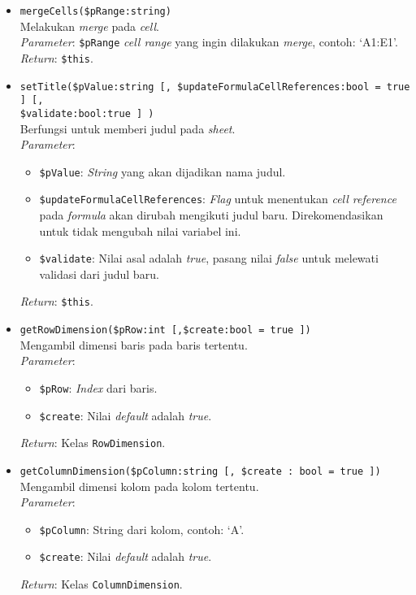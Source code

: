 \begin{itemize}
	\item \texttt{mergeCells(\$pRange:string)} \\ 
	Melakukan \textit{merge} pada \textit{cell}. \\ 
	\textit{Parameter}: \texttt{\$pRange} \textit{cell range} yang ingin dilakukan \textit{merge}, contoh: `A1:E1'. \\
	\textit{Return}: \texttt{\$this}.
	\item \texttt{setTitle(\$pValue:string [, \$updateFormulaCellReferences:bool = true ] [, \\ \$validate:bool:true ] )}\\
	 Berfungsi untuk memberi judul pada \textit{sheet}. \\
	 \textit{Parameter}:
	 \begin{itemize}
	 	\item \texttt{\$pValue}: \textit{String} yang akan dijadikan nama judul.
	 	\item \texttt{\$updateFormulaCellReferences}: \textit{Flag} untuk menentukan \textit{cell reference} pada \textit{formula} akan dirubah mengikuti judul baru. Direkomendasikan untuk tidak mengubah nilai variabel ini.
	 	\item \texttt{\$validate}: Nilai asal adalah \textit{true}, pasang nilai \textit{false} untuk melewati validasi dari judul baru.
	 \end{itemize}
 	\textit{Return}: \texttt{\$this}.
	\item \texttt{getRowDimension(\$pRow:int [,\$create:bool = true ])} \\ 
	Mengambil dimensi baris pada baris tertentu. \\
	\textit{Parameter}: 
	\begin{itemize}
		\item \texttt{\$pRow}: \textit{Index} dari baris.
		\item \texttt{\$create}: Nilai \textit{default} adalah \textit{true}.
	\end{itemize}
	\textit{Return}: Kelas \texttt{RowDimension}.
	\item \texttt{getColumnDimension(\$pColumn:string [, \$create : bool = true ])} \\
	Mengambil dimensi kolom pada kolom tertentu. \\
	\textit{Parameter}:
	\begin{itemize}
		\item \texttt{\$pColumn}: String dari kolom, contoh: `A'.
		\item \texttt{\$create}: Nilai \textit{default} adalah \textit{true}.
	\end{itemize}
	\textit{Return}: Kelas \texttt{ColumnDimension}.
\end{itemize}

